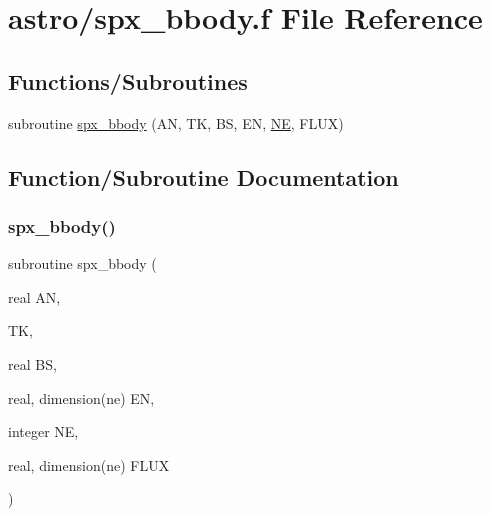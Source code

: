 \hypertarget{spx__bbody_8f}{}\section{astro/spx\+\_\+bbody.f File Reference}
\label{spx__bbody_8f}
\subsection*{Functions/\+Subroutines}
\begin{DoxyCompactItemize}
\item 
subroutine \hyperlink{spx__bbody_8f_abf2bb00f830a371aececc467ef0a1d1f}{spx\+\_\+bbody} (AN, TK, BS, EN, \hyperlink{eval__tab_8h_a5af9139e882aef6c820ae908589a40d6}{NE}, F\+L\+UX)
\end{DoxyCompactItemize}


\subsection{Function/\+Subroutine Documentation}
\mbox{\label{spx__bbody_8f_abf2bb00f830a371aececc467ef0a1d1f}} 
\subsubsection{\texorpdfstring{spx\+\_\+bbody()}{spx\_bbody()}}
{\footnotesize\ttfamily subroutine spx\+\_\+bbody (\begin{DoxyParamCaption}\item[{real}]{AN,  }\item[{}]{TK,  }\item[{real}]{BS,  }\item[{real, dimension(ne)}]{EN,  }\item[{integer}]{NE,  }\item[{real, dimension(ne)}]{F\+L\+UX }\end{DoxyParamCaption})}

